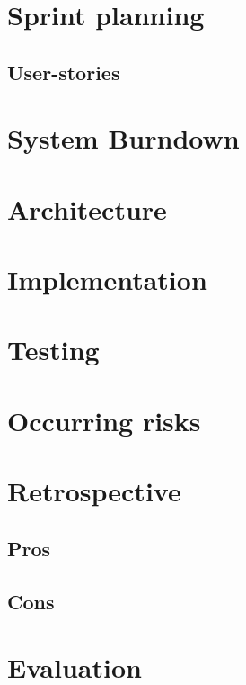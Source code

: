 \section{Sprint planning}
\subsection{User-stories}
\section{System Burndown}
\section{Architecture}
\section{Implementation}
\section{Testing}
\section{Occurring risks}
\section{Retrospective}
\subsection{Pros}
\subsection{Cons}
\section{Evaluation}